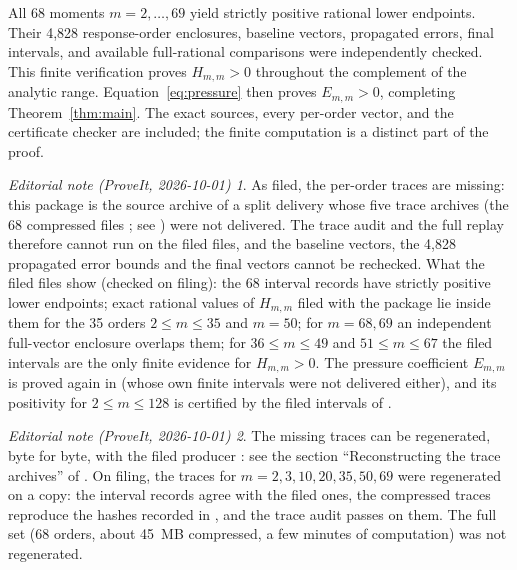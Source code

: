 \documentclass[11pt,a4paper]{article}
\theoremstyle{remark}\newtheorem*{ednote}{Editorial note (ProveIt, 2026-10-01)}
\begin{document}
All 68 moments $m=2,\ldots,69$ yield strictly positive rational lower endpoints. Their 4,828 response-order enclosures, baseline vectors, propagated errors, final intervals, and available full-rational comparisons were independently checked. This finite verification proves $H_{m,m}>0$ throughout the complement of the analytic range. Equation~\eqref{eq:pressure} then proves $E_{m,m}>0$, completing Theorem~\ref{thm:main}. The exact sources, every per-order vector, and the certificate checker are included; the finite computation is a distinct part of the proof.
\begin{ednote}
As filed, the per-order traces are missing: this package is the source archive of a split
delivery whose five trace archives (the 68 compressed files
; see ) were not
delivered. The trace audit  and the full replay
 therefore cannot run on the filed files, and the baseline vectors,
the 4,828 propagated error bounds and the final vectors cannot be rechecked. What the filed
files show (checked on filing): the 68 interval records
 have strictly positive lower endpoints; exact
rational values of $H_{m,m}$ filed with the package lie inside them for the 35 orders
$2\le m\le35$ and $m=50$; for $m=68,69$ an independent full-vector enclosure overlaps them;
for $36\le m\le49$ and $51\le m\le67$ the filed intervals are the only finite evidence for
$H_{m,m}>0$. The pressure coefficient $E_{m,m}$ is proved again in  (whose own finite intervals were not delivered either), and its positivity for
$2\le m\le128$ is certified by the filed intervals of .
\end{ednote}
\begin{ednote}
The missing traces can be regenerated, byte for byte, with the filed producer
: see the section ``Reconstructing the trace archives''
of . On filing, the traces for $m=2,3,10,20,35,50,69$ were regenerated on a
copy: the interval records agree with the filed ones, the compressed traces reproduce the
hashes recorded in , and the trace audit passes on them. The full
set (68 orders, about 45~MB compressed, a few minutes of computation) was not regenerated.
\end{ednote}
\end{document}
